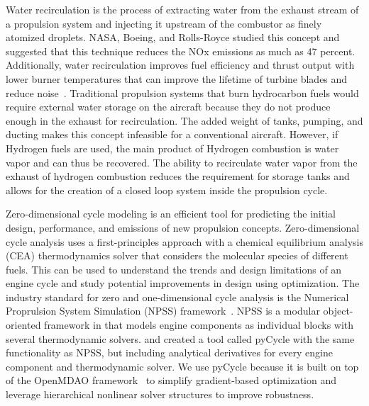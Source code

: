 \documentclass[conf]{new-aiaa}
\begin{document}
Water recirculation is the process of extracting water from the exhaust stream of a propulsion system and injecting it upstream of the combustor as finely atomized droplets.
NASA, Boeing, and Rolls-Royce studied this concept and suggested that this technique reduces the NOx emissions as much as 47 percent.
Additionally, water recirculation improves fuel efficiency and thrust output with lower burner temperatures that can improve the lifetime of turbine blades and reduce noise~\cite{nasa_inject}.
Traditional propulsion systems that burn hydrocarbon fuels would require external water storage on the aircraft because they do not produce enough in the exhaust for recirculation.
The added weight of tanks, pumping, and ducting makes this concept infeasible for a conventional aircraft.
However, if Hydrogen fuels are used, the main product of Hydrogen combustion is water vapor and can thus be recovered.
The ability to recirculate water vapor from the exhaust of hydrogen combustion reduces the requirement for storage tanks and allows for the creation of a closed loop system inside the propulsion cycle.

Zero-dimensional cycle modeling is an efficient tool for predicting the initial design, performance, and emissions of new propulsion concepts.
Zero-dimensional cycle analysis uses a first-principles approach with a chemical equilibrium analysis (CEA) thermodynamics solver that considers the molecular species of different fuels.
This can be used to understand the trends and design limitations of an engine cycle and study potential improvements in design using optimization.
The industry standard for zero and one-dimensional cycle analysis is the Numerical Proprulsion System Simulation (NPSS) framework~\cite{JonesNPSS}.
NPSS is a modular object-oriented framework in that models engine components as individual blocks with several thermodynamic solvers.
\citet{Hendricks2019} and \citet{Gray2017b} created a tool called pyCycle with the same functionality as NPSS, but including analytical derivatives for every engine component and thermodynamic solver.
We use pyCycle because it is built on top of the OpenMDAO framework~\cite{Gray2019a} to simplify gradient-based optimization and leverage hierarchical nonlinear solver structures to improve robustness.
\end{document}
